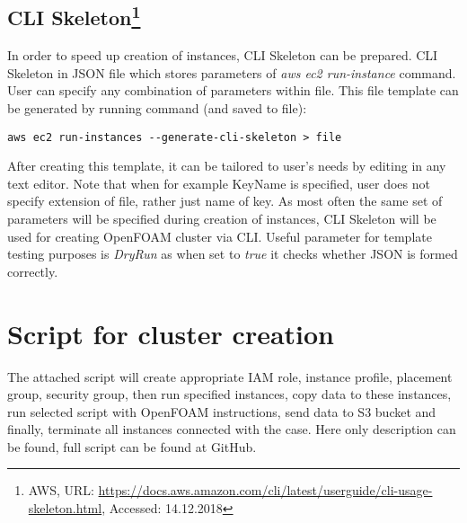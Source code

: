 \documentclass[11pt,english]{article}
\begin{document}
\subsection{\texorpdfstring{CLI Skeleton\footnote{AWS, URL: \url{https://docs.aws.amazon.com/cli/latest/userguide/cli-usage-skeleton.html}, Accessed: 14.12.2018}}{CLI Skeleton}}

In order to speed up creation of instances, CLI Skeleton can be prepared. CLI Skeleton in JSON file which stores parameters of \textit{aws ec2 run-instance} command. User can specify any combination of parameters within file. This file template can be generated by running command (and saved to file):
\begin{lstlisting}
aws ec2 run-instances --generate-cli-skeleton > file
\end{lstlisting}
After creating this template, it can be tailored to user's needs by editing in any text editor. Note that when for example KeyName is specified, user does not specify extension of file, rather just name of key. As most often the same set of parameters will be specified during creation of instances, CLI Skeleton will be used for creating OpenFOAM cluster via CLI. Useful parameter for template testing purposes is \textit{DryRun} as when set to \textit{true} it checks whether JSON is formed correctly.

\section{Script for cluster creation}

The attached script will create appropriate IAM role, instance profile, placement group, security group, then run specified instances, copy data to these instances, run selected script with OpenFOAM instructions, send data to S3 bucket and finally, terminate all instances connected with the case. Here only description can be found, full script can be found at GitHub.
\end{document}
